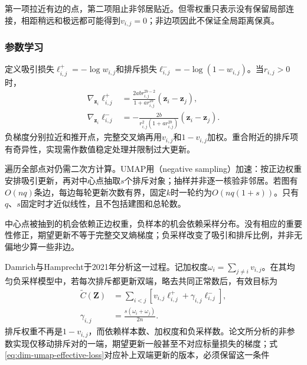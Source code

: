 第一项拉近有边的点，第二项阻止非邻居贴近。但零权重只表示没有保留局部连接，相距稍远和极远都可能得到$v_{i,j}=0$；非边项因此不保证全局距离保真。

\subsubsection{参数学习}

定义吸引损失$\ell^+_{i,j}=-\log w_{i,j}$和排斥损失$\ell^-_{i,j}=-\log(1-w_{i,j})$。当$r_{i,j}>0$时，
\begin{equation}
  \label{eq:dim-umap-pair-gradient}
  \begin{aligned}
    \nabla_{\bm{z}_i}\ell^+_{i,j}
      &=\frac{2ab r_{i,j}^{2b-2}}
        {1+a r_{i,j}^{2b}}(\bm{z}_i-\bm{z}_j),\\
    \nabla_{\bm{z}_i}\ell^-_{i,j}
      &=-\frac{2b}
        {r_{i,j}^2(1+a r_{i,j}^{2b})}
        (\bm{z}_i-\bm{z}_j).
  \end{aligned}
\end{equation}
负梯度分别拉近和推开点，完整交叉熵再用$v_{i,j}$和$1-v_{i,j}$加权。重合附近的排斥项有奇异性，实现需作数值稳定处理并限制过大更新。

遍历全部点对仍需二次方计算。UMAP用（negative sampling）加速：按正边权重安排吸引更新，再对中心点抽取$s$个排斥对象；抽样并非逐一核验非邻居。若图有$O(nq)$条边，每边每轮更新次数有界，固定$k$时一轮约为$O(nq(1+s))$。只有$q$、$s$固定时才近似线性，且不包括建图和总轮数。

中心点被抽到的机会依赖正边权重，负样本的机会依赖采样分布。没有相应的重要性修正，期望更新不等于完整交叉熵梯度；负采样改变了吸引和排斥比例，并非无偏地少算一些非边。

Damrich与Hamprecht于2021年分析这一过程。记加权度$\omega_i=\sum_{j\ne i}v_{i,j}$。在其均匀负采样模型中，若每次排斥都更新双端，略去共同正常数后，有效目标为
\begin{equation}
  \label{eq:dim-umap-effective-loss}
  \begin{aligned}
    \widetilde C(\bm{Z})
      &=\sum_{i<j}\left[
        v_{i,j}\ell^+_{i,j}
        +\gamma_{i,j}\ell^-_{i,j}\right],\\
    \gamma_{i,j}&=\frac{s(\omega_i+\omega_j)}{2n}.
  \end{aligned}
\end{equation}
排斥权重不再是$1-v_{i,j}$，而依赖样本数、加权度和负采样数。论文所分析的非参数实现仅移动排斥对的一端，期望更新一般甚至不对应标量损失的梯度；式\eqref{eq:dim-umap-effective-loss}对应补上双端更新的版本，必须保留这一条件


